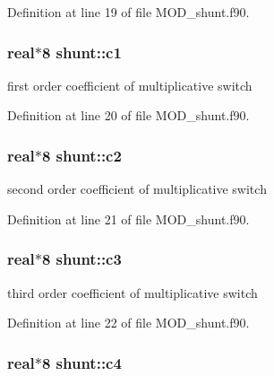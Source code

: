 Definition at line 19 of file M\-O\-D\-\_\-shunt.\-f90.

\hypertarget{classshunt_aa6800509bde03cfb64b0ea83c4279622}{
\subsubsection[{c1}]{\setlength{\rightskip}{0pt plus 5cm}real$\ast$8 shunt\-::c1}}\label{classshunt_aa6800509bde03cfb64b0ea83c4279622}


first order coefficient of multiplicative switch 



Definition at line 20 of file M\-O\-D\-\_\-shunt.\-f90.

\hypertarget{classshunt_a17753b6e4291d434b9716b57c316f34c}{
\subsubsection[{c2}]{\setlength{\rightskip}{0pt plus 5cm}real$\ast$8 shunt\-::c2}}\label{classshunt_a17753b6e4291d434b9716b57c316f34c}


second order coefficient of multiplicative switch 



Definition at line 21 of file M\-O\-D\-\_\-shunt.\-f90.

\hypertarget{classshunt_a3e2ec36e1f551a9f6ae83d81578101b6}{
\subsubsection[{c3}]{\setlength{\rightskip}{0pt plus 5cm}real$\ast$8 shunt\-::c3}}\label{classshunt_a3e2ec36e1f551a9f6ae83d81578101b6}


third order coefficient of multiplicative switch 



Definition at line 22 of file M\-O\-D\-\_\-shunt.\-f90.

\hypertarget{classshunt_a24fede963dce84d5d0976925f61a204b}{
\subsubsection[{c4}]{\setlength{\rightskip}{0pt plus 5cm}real$\ast$8 shunt\-::c4}}\label{classshunt_a24fede963dce84d5d0976925f61a204b}


